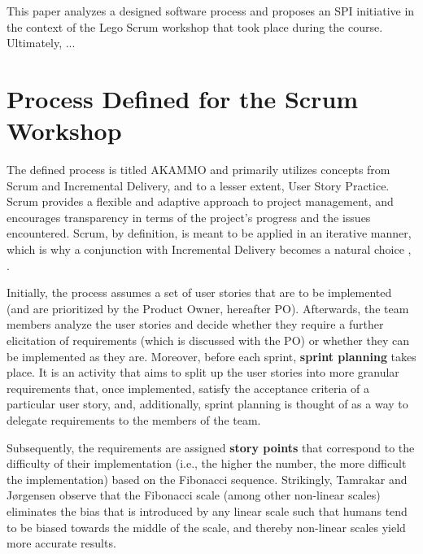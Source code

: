 \documentclass[conference]{IEEEtran}
\begin{document}
This paper analyzes a designed software process and proposes an SPI initiative 
in the context of the Lego Scrum workshop that took place during the course.
Ultimately, ... %

\section{Process Defined for the Scrum Workshop}
\label{sec:process}


The defined process is titled {\selectfont AKAMMO} and primarily
utilizes concepts from Scrum and Incremental Delivery, and to a lesser extent,
User Story Practice. Scrum provides a flexible and adaptive approach to project
management, and encourages transparency in terms of the project's progress and
the issues encountered. Scrum, by definition, is meant to be applied in an
iterative manner, which is why a conjunction with Incremental Delivery becomes
a natural choice \cite{Srivastava2017}, \cite{Schwaber1997}.

Initially, the process assumes a set of user stories that are to be implemented
(and are prioritized by the Product Owner, hereafter PO). Afterwards, the team
members analyze the user stories and decide whether they require a further
elicitation of requirements (which is discussed with the PO) or whether they
can be implemented as they are.
Moreover, before each sprint, \textbf{sprint planning} takes place. It is an
activity that aims to split up the user stories into more granular requirements
that, once implemented, satisfy the acceptance criteria of a particular user
story, and, additionally, sprint planning is thought of as a way to delegate
requirements to the members of the team.

Subsequently, the requirements are assigned \textbf{story points} that
correspond to the difficulty of their implementation (i.e., the higher
the number, the more difficult the implementation) based on the Fibonacci
sequence. Strikingly, Tamrakar and Jørgensen \cite{Tamrakar2012} observe that
the Fibonacci scale (among other non-linear scales) eliminates the bias that is
introduced by any linear scale such that humans tend to be biased towards the
middle of the scale, and thereby non-linear scales yield more accurate results.
\end{document}
